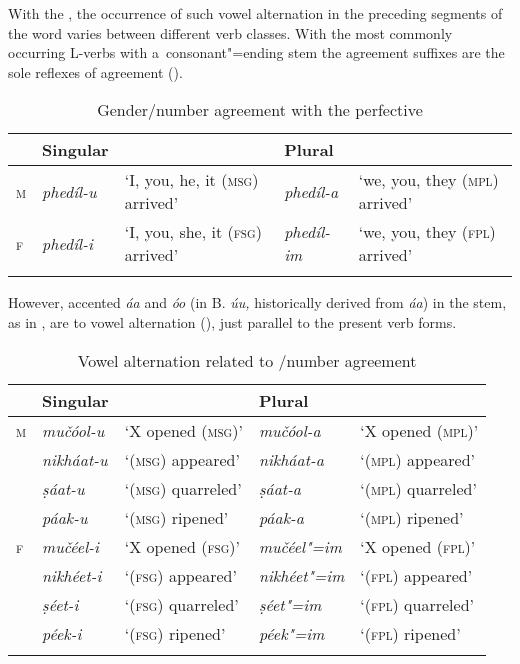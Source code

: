 With the , the occurrence of such vowel alternation in the preceding segments of the word varies between different verb classes. With the most commonly occurring L-verbs with a~consonant"=ending stem the agreement suffixes are the sole reflexes of agreement ().


\begin{table}[ht]
\caption{Gender/number agreement with the perfective}

\begin{tabularx}{\textwidth}{ l l Q l Q }
\lsptoprule
&
Singular &
&
Plural &
\\\hline
\textsc{m} &
\textit{phedíl-u} &
`I, you, he, it (\textsc{msg}) arrived' &
\textit{phedíl-a} &
`we, you, they (\textsc{mpl}) arrived'\\
\textsc{f} &
\textit{phedíl-i} &
`I, you, she, it (\textsc{fsg}) arrived' &
\textit{phedíl-im} &
`we, you, they (\textsc{fpl}) arrived'\\\lspbottomrule
\end{tabularx}
\label{tab:8-19}
\end{table}


However, accented \textit{áa} and \textit{óo} (in B. \textit{úu,} historically derived from \textit{áa}) in the  stem, as in , are  to vowel alternation (), just parallel to the present verb forms. 


\begin{table}[ht]
\caption{Vowel alternation related to /number agreement}

\begin{tabularx}{\textwidth}{ l l@{\hspace{20pt}} l@{\hspace{20pt}} l@{\hspace{20pt}} l@{\hspace{20pt}} }
\lsptoprule
&
Singular &
&
Plural &
\\\hline
\textsc{m} &
\textit{mučóol-u} &
`X opened (\textsc{msg})' &
\textit{mučóol-a} &
`X opened (\textsc{mpl})'\\
&
\textit{nikháat-u} &
`(\textsc{msg}) appeared' &
\textit{nikháat-a} &
`(\textsc{mpl}) appeared'\\
&
\textit{ṣáat-u} &
`(\textsc{msg}) quarreled' &
\textit{ṣáat-a} &
`(\textsc{mpl}) quarreled'\\
&
\textit{páak-u} &
`(\textsc{msg}) ripened' &
\textit{páak-a} &
`(\textsc{mpl}) ripened'\\
\textsc{f} &
\textit{mučéel-i} &
`X opened (\textsc{fsg})' &
\textit{mučéel"=im} &
`X opened (\textsc{fpl})'\\
&
\textit{nikhéet-i} &
`(\textsc{fsg}) appeared' &
\textit{nikhéet"=im} &
`(\textsc{fpl}) appeared'\\
&
\textit{ṣéet-i} &
`(\textsc{fsg}) quarreled' &
\textit{ṣéet"=im} &
`(\textsc{fpl}) quarreled'\\
&
\textit{péek-i} &
`(\textsc{fsg}) ripened' &
\textit{péek"=im} &
`(\textsc{fpl}) ripened'\\\lspbottomrule
\end{tabularx}
\label{tab:8-20}
\end{table}


